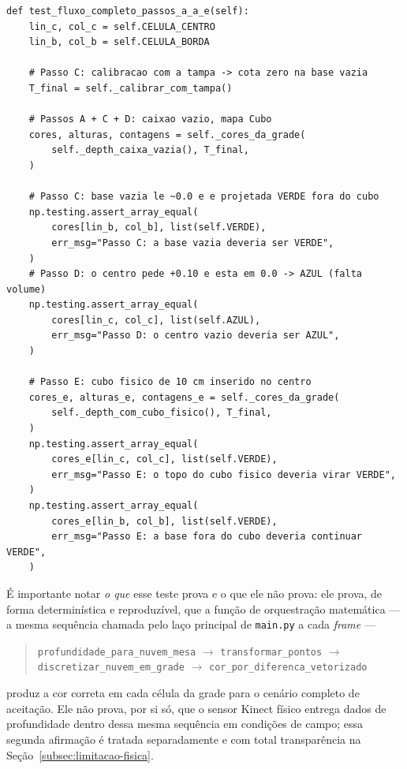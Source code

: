 \begin{lstlisting}[caption={Método principal de \texttt{TestFluxoAceitacao}, extraído literalmente de \texttt{test\_motor\_caixao.py} (linhas 1989--2037).}, label=lst:e2e-code]
def test_fluxo_completo_passos_a_a_e(self):
    lin_c, col_c = self.CELULA_CENTRO
    lin_b, col_b = self.CELULA_BORDA

    # Passo C: calibracao com a tampa -> cota zero na base vazia
    T_final = self._calibrar_com_tampa()

    # Passos A + C + D: caixao vazio, mapa Cubo
    cores, alturas, contagens = self._cores_da_grade(
        self._depth_caixa_vazia(), T_final,
    )

    # Passo C: base vazia le ~0.0 e e projetada VERDE fora do cubo
    np.testing.assert_array_equal(
        cores[lin_b, col_b], list(self.VERDE),
        err_msg="Passo C: a base vazia deveria ser VERDE",
    )
    # Passo D: o centro pede +0.10 e esta em 0.0 -> AZUL (falta volume)
    np.testing.assert_array_equal(
        cores[lin_c, col_c], list(self.AZUL),
        err_msg="Passo D: o centro vazio deveria ser AZUL",
    )

    # Passo E: cubo fisico de 10 cm inserido no centro
    cores_e, alturas_e, contagens_e = self._cores_da_grade(
        self._depth_com_cubo_fisico(), T_final,
    )
    np.testing.assert_array_equal(
        cores_e[lin_c, col_c], list(self.VERDE),
        err_msg="Passo E: o topo do cubo fisico deveria virar VERDE",
    )
    np.testing.assert_array_equal(
        cores_e[lin_b, col_b], list(self.VERDE),
        err_msg="Passo E: a base fora do cubo deveria continuar VERDE",
    )
\end{lstlisting}

\noindent É importante notar \emph{o que} esse teste prova e o que ele
não prova: ele prova, de forma determinística e reproduzível, que a
função de orquestração matemática — a mesma sequência chamada pelo
laço principal de \texttt{main.py} a cada \textit{frame} —

\begin{quote}
\centering
\texttt{profundidade\_para\_nuvem\_mesa} $\to$
\texttt{transformar\_pontos} $\to$
\texttt{discretizar\_nuvem\_em\_grade} $\to$
\texttt{cor\_por\_diferenca\_vetorizado}
\end{quote}

\noindent produz a cor correta em cada célula da grade para o
cenário completo de aceitação. Ele não prova, por si só, que o sensor
Kinect físico entrega dados de profundidade dentro dessa mesma
sequência em condições de campo; essa segunda afirmação é tratada
separadamente e com total transparência na
Seção~\ref{subsec:limitacao-fisica}.

